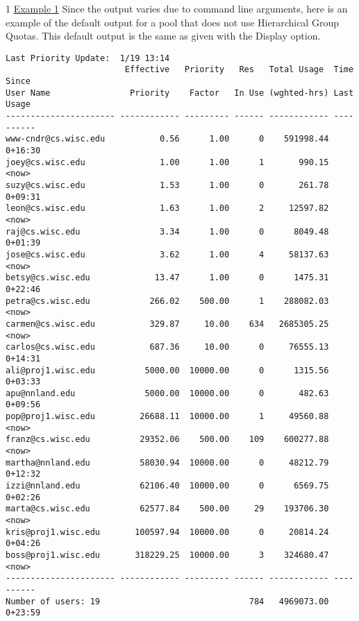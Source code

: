 \begin{ManPage}{\label{man-condor-userprio}}{1}
\underline{Example 1} Since the output varies due to command line arguments, 
here is an example of the default output for a pool that does not use 
Hierarchical Group Quotas.
This default output is the same as given with the  Display option.
\footnotesize
\begin{verbatim}
Last Priority Update:  1/19 13:14
                        Effective   Priority   Res   Total Usage  Time Since
User Name                Priority    Factor   In Use (wghted-hrs) Last Usage
---------------------- ------------ --------- ------ ------------ ----------
www-cndr@cs.wisc.edu           0.56      1.00      0    591998.44    0+16:30
joey@cs.wisc.edu               1.00      1.00      1       990.15 <now>
suzy@cs.wisc.edu               1.53      1.00      0       261.78    0+09:31
leon@cs.wisc.edu               1.63      1.00      2     12597.82 <now>
raj@cs.wisc.edu                3.34      1.00      0      8049.48    0+01:39
jose@cs.wisc.edu               3.62      1.00      4     58137.63 <now>
betsy@cs.wisc.edu             13.47      1.00      0      1475.31    0+22:46
petra@cs.wisc.edu            266.02    500.00      1    288082.03 <now>
carmen@cs.wisc.edu           329.87     10.00    634   2685305.25 <now>
carlos@cs.wisc.edu           687.36     10.00      0     76555.13    0+14:31
ali@proj1.wisc.edu          5000.00  10000.00      0      1315.56    0+03:33
apu@nnland.edu              5000.00  10000.00      0       482.63    0+09:56
pop@proj1.wisc.edu         26688.11  10000.00      1     49560.88 <now>
franz@cs.wisc.edu          29352.06    500.00    109    600277.88 <now>
martha@nnland.edu          58030.94  10000.00      0     48212.79    0+12:32
izzi@nnland.edu            62106.40  10000.00      0      6569.75    0+02:26
marta@cs.wisc.edu          62577.84    500.00     29    193706.30 <now>
kris@proj1.wisc.edu       100597.94  10000.00      0     20814.24    0+04:26
boss@proj1.wisc.edu       318229.25  10000.00      3    324680.47 <now>
---------------------- ------------ --------- ------ ------------ ----------
Number of users: 19                              784   4969073.00    0+23:59 
\end{verbatim}
\normalsize


\end{ManPage}
